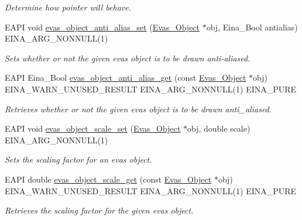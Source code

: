 \begin{DoxyCompactItemize}
\begin{DoxyCompactList}\small\item\em Determine how pointer will behave. \item\end{DoxyCompactList}\item 
EAPI void \hyperlink{group__Evas__Object__Group__Extras_gaf0c7d4c49695749fa616d0abdbd5ddeb}{evas\_\-object\_\-anti\_\-alias\_\-set} (\hyperlink{group__Evas__Object__Group_ga9e19e6dd1f517a0ba437c0114d3e7c97}{Evas\_\-Object} $\ast$obj, Eina\_\-Bool antialias) EINA\_\-ARG\_\-NONNULL(1)
\begin{DoxyCompactList}\small\item\em Sets whether or not the given evas object is to be drawn anti-\/aliased. \item\end{DoxyCompactList}\item 
EAPI Eina\_\-Bool \hyperlink{group__Evas__Object__Group__Extras_ga3308cb65716beb4ce826b9701e23159a}{evas\_\-object\_\-anti\_\-alias\_\-get} (const \hyperlink{group__Evas__Object__Group_ga9e19e6dd1f517a0ba437c0114d3e7c97}{Evas\_\-Object} $\ast$obj) EINA\_\-WARN\_\-UNUSED\_\-RESULT EINA\_\-ARG\_\-NONNULL(1) EINA\_\-PURE
\begin{DoxyCompactList}\small\item\em Retrieves whether or not the given evas object is to be drawn anti\_\-aliased. \item\end{DoxyCompactList}\item 
EAPI void \hyperlink{group__Evas__Object__Group__Extras_gaf010777fa1b58bd1c9c8093d2edc62e9}{evas\_\-object\_\-scale\_\-set} (\hyperlink{group__Evas__Object__Group_ga9e19e6dd1f517a0ba437c0114d3e7c97}{Evas\_\-Object} $\ast$obj, double scale) EINA\_\-ARG\_\-NONNULL(1)
\begin{DoxyCompactList}\small\item\em Sets the scaling factor for an evas object. \item\end{DoxyCompactList}\item 
EAPI double \hyperlink{group__Evas__Object__Group__Extras_ga1c0aca3af434f0bc0fa8732248b197ba}{evas\_\-object\_\-scale\_\-get} (const \hyperlink{group__Evas__Object__Group_ga9e19e6dd1f517a0ba437c0114d3e7c97}{Evas\_\-Object} $\ast$obj) EINA\_\-WARN\_\-UNUSED\_\-RESULT EINA\_\-ARG\_\-NONNULL(1) EINA\_\-PURE
\begin{DoxyCompactList}\small\item\em Retrieves the scaling factor for the given evas object. \item\end{DoxyCompactList}\item 

\end{DoxyCompactItemize}
